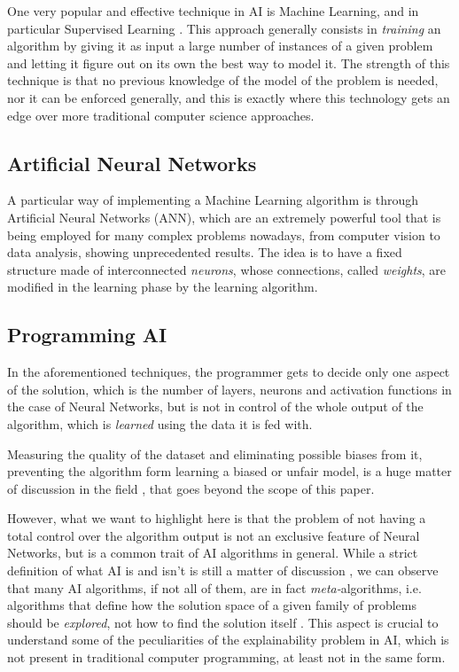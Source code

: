 \documentclass[conference]{IEEEtran}
\newcommand{\cit}{\todo[tickmarkheight=0.2cm]{cit}}
\begin{document}
One very popular and effective technique in AI is Machine Learning, and in
particular Supervised Learning \cit. This approach generally consists in
\textit{training} an algorithm by giving it as input a large number of instances
of a given problem and letting it figure out on its own the best way to model it. The
strength of this technique is that no previous knowledge of the model of the
problem is needed, nor it can be enforced generally, and this is exactly
where this technology gets an edge over more traditional computer science
approaches.

\subsection{Artificial Neural Networks}
\label{sec:nn}

A particular way of implementing a Machine Learning algorithm is through Artificial Neural Networks (ANN), which are an extremely powerful tool that is being employed for many complex problems nowadays, from computer vision to data analysis, showing unprecedented results. The idea is to have a fixed structure made of interconnected \textit{neurons}, whose connections, called \textit{weights}, are modified in the learning phase by the learning algorithm.

\subsection{Programming AI}
\label{sec:aiprog}

In the aforementioned techniques, the programmer gets to decide only one aspect of the solution, which is the number of layers, neurons and activation functions in the case of Neural Networks, but is not in control of the whole output of the algorithm, which is \textit{learned} using the data it is fed with.

Measuring the quality of the dataset and eliminating possible biases from it, preventing the algorithm form learning a biased or unfair model, is a huge matter of discussion in the field \cit, that goes beyond the scope of this paper.

However, what we want to highlight here is that the problem of not having a total control over the algorithm output is not an exclusive feature of Neural Networks, but is a common trait of AI algorithms in general. While a strict definition of what AI is and isn't is still a matter of discussion \cit, we can observe that many AI algorithms, if not all of them, are in fact \textit{meta-}algorithms, i.e. algorithms that define how the solution space of a given family of problems should be \textit{explored}, not how to find the solution itself \cit. This aspect is crucial to understand some of the peculiarities of the explainability problem in AI, which is not present in traditional computer programming, at least not in the same form.
\end{document}
